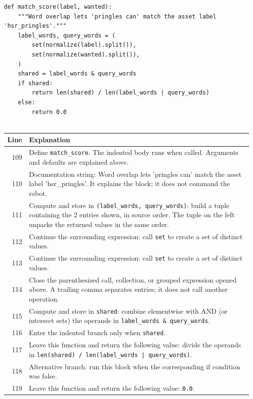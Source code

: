 \documentclass[11pt,a4paper]{book}
\begin{document}
\begin{lstlisting}[firstnumber=109]
def match_score(label, wanted):
    """Word overlap lets 'pringles can' match the asset label 'hsr_pringles'."""
    label_words, query_words = (
        set(normalize(label).split()),
        set(normalize(wanted).split()),
    )
    shared = label_words & query_words
    if shared:
        return len(shared) / len(label_words | query_words)
    else:
        return 0.0


\end{lstlisting}

\begin{longtable}{r p{}}

\textbf{Line} & \textbf{Explanation} \\ \hline \endhead

109 & Define \texttt{match\_score}. The indented body runs when called. Arguments and defaults are explained above. \\

110 & Documentation string: Word overlap lets 'pringles can' match the asset label 'hsr\_pringles'. It explains the block; it does not command the robot. \\

111 & Compute and store in \texttt{(label\_words, query\_words)}: build a tuple containing the 2 entries shown, in source order. The tuple on the left unpacks the returned values in the same order. \\

112 & Continue the surrounding expression: call \texttt{set} to create a set of distinct values. \\

113 & Continue the surrounding expression: call \texttt{set} to create a set of distinct values. \\

114 & Close the parenthesized call, collection, or grouped expression opened above. A trailing comma separates entries; it does not call another operation. \\

115 & Compute and store in \texttt{shared}: combine elementwise with AND (or intersect sets) the operands in \texttt{label\_words \& query\_words}.  \\

116 & Enter the indented branch only when \texttt{shared}. \\

117 & Leave this function and return the following value: divide the operands in \texttt{len(shared) / len(label\_words | query\_words)}. \\

118 & Alternative branch: run this block when the corresponding if condition was false. \\

119 & Leave this function and return the following value: \texttt{0.0}. \\

\end{longtable}
\end{document}

